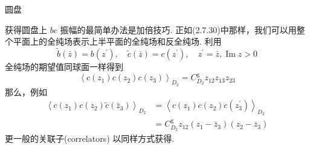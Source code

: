 \centerline{\Large 圆盘}
获得圆盘上 $b c$ 振幅的最简单办法是加倍技巧. 正如(2.7.30)中那样，我们可以用整个平面上的全纯场表示上半平面的全纯场和反全纯场. 利用
\begin{equation}
	\tilde{b}(\bar{z})=b\left(z^{\prime}\right), \quad \tilde{c}(\bar{z})=c\left(z^{\prime}\right), \quad z^{\prime}=\bar{z}, \operatorname{Im} z>0
\end{equation}
全纯场的期望值同球面一样得到
\begin{equation}
	\left\langle c\left(z_{1}\right) c\left(z_{2}\right) c\left(z_{3}\right)\right\rangle_{D_{2}}=C_{D_{2}}^{\mathrm{g}} z_{12} z_{13} z_{23}
\end{equation}
那么，例如
\begin{equation}
	\begin{aligned}
		\left\langle c\left(z_{1}\right) c\left(z_{2}\right) \tilde{c}\left(\bar{z}_{3}\right)\right\rangle_{D_{2}} &=\left\langle c\left(z_{1}\right) c\left(z_{2}\right) c\left(z_{3}^{\prime}\right)\right\rangle_{D_{2}} \\
		&=C_{D_{2}}^{\mathrm{g}} z_{12}\left(z_{1}-\bar{z}_{3}\right)\left(z_{2}-\bar{z}_{3}\right)
	\end{aligned}
\end{equation}
更一般的关联子(correlators) 以同样方式获得.\\


